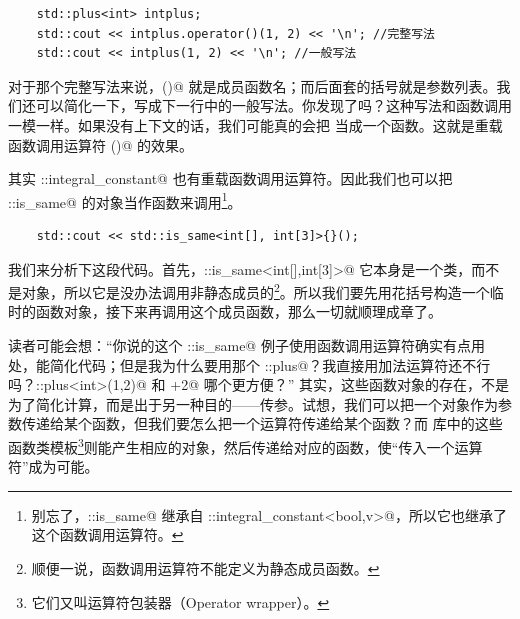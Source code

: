 \begin{lstlisting}
    std::plus<int> intplus;
    std::cout << intplus.operator()(1, 2) << '\n'; //完整写法
    std::cout << intplus(1, 2) << '\n'; //一般写法
\end{lstlisting}
对于那个完整写法来说，\lstinline@operator()@ 就是成员函数名；而后面套的括号就是参数列表。我们还可以简化一下，写成下一行中的一般写法。你发现了吗？这种写法和函数调用一模一样。如果没有上下文的话，我们可能真的会把 \lstinline@intplus@ 当成一个函数。这就是重载函数调用运算符 \lstinline@()@ 的效果。\par
其实 \lstinline@std::integral_constant@ 也有重载函数调用运算符。因此我们也可以把 \lstinline@std::is_same@ 的对象当作函数来调用\footnote{别忘了，\lstinline@std::is_same@ 继承自 \lstinline@std::integral_constant<bool,v>@，所以它也继承了这个函数调用运算符。}。
\begin{lstlisting}
    std::cout << std::is_same<int[], int[3]>{}();
\end{lstlisting}
我们来分析下这段代码。首先，\lstinline@std::is_same<int[],int[3]>@ 它本身是一个类，而不是对象，所以它是没办法调用非静态成员的\footnote{顺便一说，函数调用运算符不能定义为静态成员函数。}。所以我们要先用花括号构造一个临时的函数对象，接下来再调用这个成员函数，那么一切就顺理成章了。\par
读者可能会想：``你说的这个 \lstinline@std::is_same@ 例子使用函数调用运算符确实有点用处，能简化代码；但是我为什么要用那个 \lstinline@std::plus@？我直接用加法运算符还不行吗？\lstinline@std::plus<int>{}(1,2)@ 和 +2@ 哪个更方便？''
其实，这些函数对象的存在，不是为了简化计算，而是出于另一种目的——传参。试想，我们可以把一个对象作为参数传递给某个函数，但我们要怎么把一个运算符传递给某个函数？而 \lstinline@functional@ 库中的这些函数类模板\footnote{它们又叫运算符包装器（Operator wrapper）。}则能产生相应的对象，然后传递给对应的函数，使``传入一个运算符''成为可能。\par
